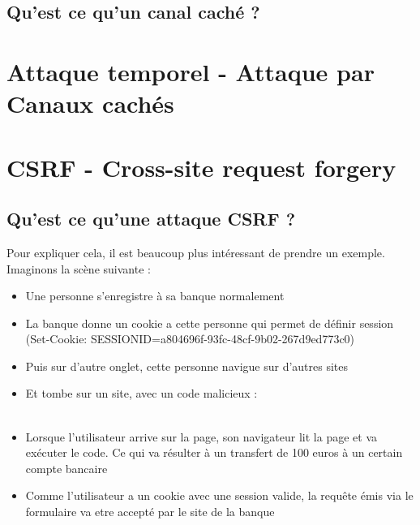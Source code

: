 \documentclass{article}
\begin{document}
\subsection{Qu'est ce qu'un canal caché ?}


\newpage
\section{Attaque temporel - Attaque par Canaux cachés}

\newpage
\section{CSRF - Cross-site request forgery}
\subsection{Qu'est ce qu'une attaque CSRF ?}
Pour expliquer cela, il est beaucoup plus intéressant de prendre un exemple. Imaginons la scène suivante :\\
\begin{itemize}
\item Une personne s'enregistre à sa banque normalement\\
\item La banque donne un cookie a cette personne qui permet de définir session\\
 (Set-Cookie: SESSIONID=a804696f-93fc-48cf-9b02-267d9ed773c0)\\
\item Puis sur d'autre onglet, cette personne navigue sur d'autres sites\\
\item Et tombe sur un site, avec un code malicieux :\\
\\
\item Lorsque l'utilisateur arrive sur la page, son navigateur lit la page et va exécuter le code. Ce qui va résulter à un transfert de 100 euros à un certain compte bancaire\\
\item Comme l'utilisateur a un cookie avec une session valide, la requête émis via le formulaire va etre accepté par le site de la banque
\end{itemize}
\end{document}
